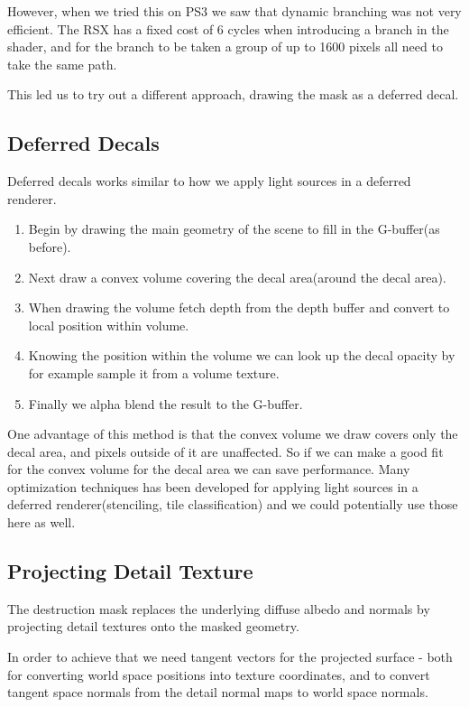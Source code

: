 However, when we tried this on PS3 we saw that dynamic branching was not very efficient. The RSX has a fixed cost of 6 cycles when introducing a branch in the shader, and for the branch to be taken a group of up to 1600 pixels all need to take the same path.

This led us to try out a different approach, drawing the mask as a deferred decal.

\subsection{Deferred Decals}
Deferred decals works similar to how we apply light sources in a deferred renderer.

\begin{enumerate}
	\item Begin by drawing the main geometry of the scene to fill in the G-buffer(as before).
	\item Next draw a convex volume covering the decal area(around the decal area).
	\item When drawing the volume fetch depth from the depth buffer and convert to local position within volume.
	\item Knowing the position within the volume we can look up the decal opacity by for example sample it from a volume texture.
	\item Finally we alpha blend the result to the G-buffer.
\end{enumerate}  

One advantage of this method is that the convex volume we draw covers only the decal area, and pixels outside of it are unaffected. So if we can make a good fit for the convex volume for the decal area we can save performance. Many optimization techniques has been developed for applying light sources in a deferred renderer(stenciling, tile classification) and we could potentially use those here as well.

\subsection{Projecting Detail Texture}
The destruction mask replaces the underlying diffuse albedo and normals by projecting detail textures onto the masked geometry.

In order to achieve that we need tangent vectors for the projected surface -  both for converting world space positions into texture coordinates, and to convert tangent space normals from the detail normal maps to world space normals.  

